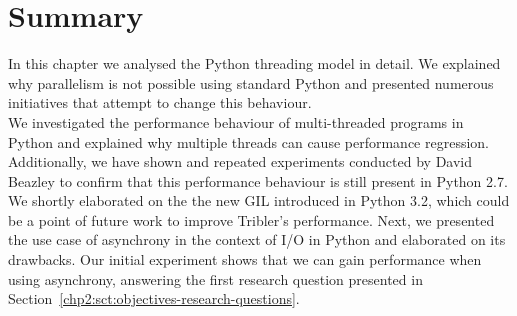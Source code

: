\section{Summary}

In this chapter we analysed the Python threading model in detail.
We explained why parallelism is not possible using standard Python and presented numerous initiatives that attempt to change this behaviour.\\
We investigated the performance behaviour of multi-threaded programs in Python and explained why multiple threads can cause performance regression.
Additionally, we have shown and repeated experiments conducted by David Beazley to confirm that this performance behaviour is still present in Python 2.7.\\
We shortly elaborated on the the new GIL introduced in Python 3.2, which could be a point of future work to improve Tribler's performance.
Next, we presented the use case of asynchrony in the context of I/O in Python and elaborated on its drawbacks.
Our initial experiment shows that we can gain performance when using asynchrony, answering the first research question presented in Section~\ref{chp2:sct:objectives-research-questions}.